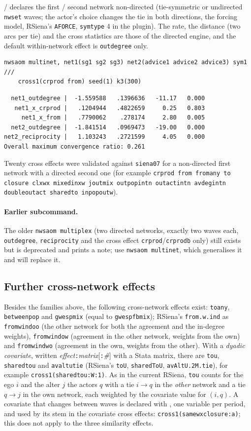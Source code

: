  /  declares the first / second network non-directed (tie-symmetric or undirected \texttt{nwset} waves; the actor's choice changes the tie in both directions, the forcing model, RSiena's \texttt{AFORCE}, \texttt{symtype} 4 in the plugin). The rate, the distance (two arcs per tie) and the cross statistics are those of the directed engine, and the default within-network effect is \texttt{outdegree} only.
\begin{lstlisting}
nwsaom multinet, net1(sg1 sg2 sg3) net2(advice1 advice2 advice3) sym1 ///
    cross1(crprod from) seed(1) k3(300)
\end{lstlisting}
\begin{lstlisting}
  net1_outdegree |  -1.559588   .1396636   -11.17   0.000
   net1_x_crprod |   .1204944   .4822659     0.25   0.803
     net1_x_from |   .7790062    .278174     2.80   0.005
  net2_outdegree |  -1.841514   .0969473   -19.00   0.000
net2_reciprocity |   1.103243   .2721599     4.05   0.000
Overall maximum convergence ratio: 0.261
\end{lstlisting}
Twenty cross effects were validated against \texttt{siena07} for a non-directed first network with a directed second one (for example \texttt{crprod from fromany to closure clxwx mixedinxw joutmix outpopintn outactintn avdegintn doubleoutact sharedto inpopoutw}).

\paragraph{Earlier subcommand.} The older \texttt{nwsaom multiplex} (two directed networks, exactly two waves each, \texttt{outdegree}, \texttt{reciprocity} and the cross effect \texttt{crprod}/\texttt{crprodb} only) still exists but is deprecated and prints a note; use \texttt{nwsaom multinet}, which generalises it and will replace it.

\subsection{Further cross-network effects}
Besides the families above, the following cross-network effects exist: \texttt{toany}, \texttt{betweenpop} and \texttt{gwespmix} (equal to \texttt{gwespfbmix}); RSiena's \texttt{from.w.ind} as \texttt{fromwindoo} (the other network for both the agreement and the in-degree weights), \texttt{fromwindow} (agreement in the other network, weights from the own) and \texttt{fromwindwo} (agreement in the own, weights from the other). With a \emph{dyadic covariate}, written \emph{effect}\texttt{:}\emph{matrix}[\texttt{:}\emph{\#}] with a Stata matrix, there are \texttt{tou}, \texttt{sharedtou} and \texttt{avaltutie} (RSiena's \texttt{toU}, \texttt{sharedToU}, \texttt{avAltU.2M.tie}), for example \texttt{cross1(sharedtou:W:1)}. As in the current RSiena, \texttt{tou} counts for the ego $i$ and the alter $j$ the actors $q$ with a tie $i\to q$ in the \emph{other} network and a tie $q\to j$ in the own network, each weighted by the covariate value for $(i,q)$. A covariate that changes between waves is declared with , one variable per period, and used by its stem in the covariate cross effects: \texttt{cross1(samewxclosure:a)}; this does not apply to the three similarity effects.

